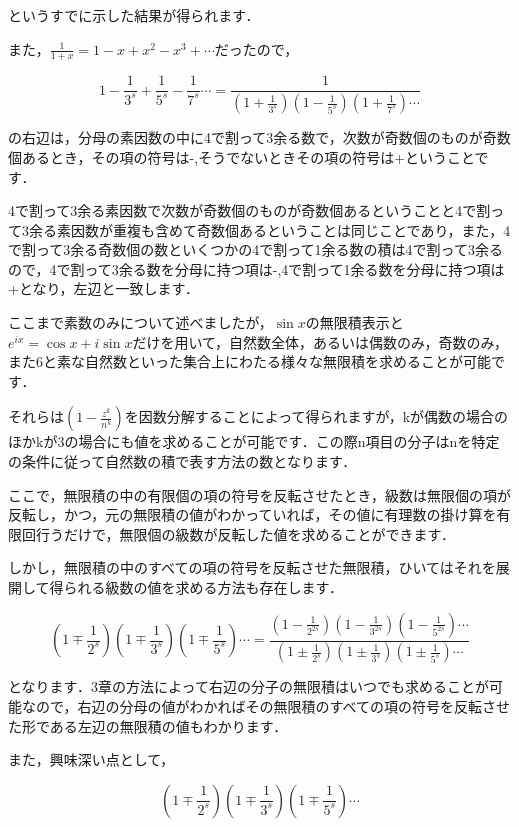 \documentclass[./main]{subfiles}
\theoremstyle{break}
\begin{document}
というすでに示した結果が得られます．

また，$\frac{1}{1+x}=1-x+x^2-x^3+\cdots$だったので，

\[1-\frac{1}{3^s}+\frac{1}{5^s}-\frac{1}{7^s}\cdots =\frac{1}{\left( 1+\frac{1}{3^s} \right)\left( 1-\frac{1}{5^s} \right)\left( 1+\frac{1}{7^s} \right)\cdots}\]

の右辺は，分母の素因数の中に4で割って3余る数で，次数が奇数個のものが奇数個あるとき，その項の符号は-,そうでないときその項の符号は+ということです．

4で割って3余る素因数で次数が奇数個のものが奇数個あるということと4で割って3余る素因数が重複も含めて奇数個あるということは同じことであり，また，4で割って3余る奇数個の数といくつかの4で割って1余る数の積は4で割って3余るので，4で割って3余る数を分母に持つ項は-,4で割って1余る数を分母に持つ項は+となり，左辺と一致します．

ここまで素数のみについて述べましたが，$\sin x$の無限積表示と$e^{ix}=\cos x+i\sin x$だけを用いて，自然数全体，あるいは偶数のみ，奇数のみ，また6と素な自然数といった集合上にわたる様々な無限積を求めることが可能です．

それらは$\left( 1-\frac{z^k}{n^k} \right)$を因数分解することによって得られますが，kが偶数の場合のほかkが3の場合にも値を求めることが可能です．この際n項目の分子はnを特定の条件に従って自然数の積で表す方法の数となります．

ここで，無限積の中の有限個の項の符号を反転させたとき，級数は無限個の項が反転し，かつ，元の無限積の値がわかっていれば，その値に有理数の掛け算を有限回行うだけで，無限個の級数が反転した値を求めることができます．

しかし，無限積の中のすべての項の符号を反転させた無限積，ひいてはそれを展開して得られる級数の値を求める方法も存在します．

\[\left( 1\mp \frac{1}{2^s} \right)\left( 1\mp \frac{1}{3^s} \right)\left( 1\mp\frac{1}{5^s} \right)\cdots=\frac{\left( 1-\frac{1}{2^{2s}} \right)\left( 1-\frac{1}{3^{2s}} \right)\left( 1-\frac{1}{5^{2s}} \right)\cdots}{\left( 1\pm \frac{1}{2^s} \right)\left( 1\pm \frac{1}{3^s} \right)\left( 1\pm\frac{1}{5^s} \right)\cdots}\]

となります．3章の方法によって右辺の分子の無限積はいつでも求めることが可能なので，右辺の分母の値がわかればその無限積のすべての項の符号を反転させた形である左辺の無限積の値もわかります．

また，興味深い点として，

\[\left( 1\mp \frac{1}{2^s} \right)\left( 1\mp \frac{1}{3^s} \right)\left( 1\mp\frac{1}{5^s} \right)\cdots\]
\end{document}
